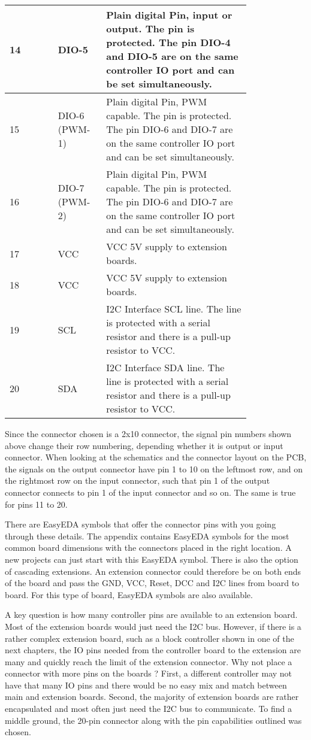 \begin{longtable}{@{}|l|p{0.2\linewidth}p{0.6\linewidth}@{}}
    \midrule
    14 & DIO-5 & Plain digital Pin, input or output. The pin is protected. The pin DIO-4 and DIO-5 are on the same controller IO port and can be set simultaneously. \\
    \midrule
    15 & DIO-6 (PWM-1) & Plain digital Pin, PWM capable. The pin is protected. The pin DIO-6 and DIO-7 are on the same controller IO port and can be set simultaneously. \\
    \midrule
    16 & DIO-7 (PWM-2) & Plain digital Pin, PWM capable. The pin is protected. The pin DIO-6 and DIO-7 are on the same controller IO port and can be set simultaneously. \\
    \midrule
    17 & VCC & VCC 5V supply to extension boards. \\
    \midrule
    18 & VCC & VCC 5V supply to extension boards. \\
    \midrule
    19 & SCL & I2C Interface SCL line. The line is protected with a serial resistor and there is a pull-up resistor to VCC. \\
    \midrule
    20 & SDA & I2C Interface SDA line. The line is protected with a serial resistor and there is a pull-up resistor to VCC. \\
\end{longtable}

Since the connector chosen is a 2x10 connector, the signal pin numbers shown above change their row numbering, depending whether it is output or input connector. When looking at the schematics and the connector layout on the PCB, the signals on the output connector have pin 1 to 10 on the leftmost row, and on the rightmost row on the input connector, such that pin 1 of the output connector connects to pin 1  of the input connector and so on. The same is true for pins 11 to 20. 

There are EasyEDA symbols that offer the connector pins with you going through these details. The appendix contains EasyEDA symbols for the most common board dimensions with the connectors placed in the right location. A new projects can just start with this EasyEDA symbol. There is also the option of  cascading extensions. An extension connector could therefore be on both ends of the board and pass the GND, VCC, Reset, DCC and I2C lines from board to board. For this type of board, EasyEDA symbols are also available.

A key question is how many controller pins are available to an extension board. Most of the extension boards would just need the I2C bus. However, if there is a rather complex extension board, such as a block controller shown in one of the next chapters, the IO pins needed from the controller board to the extension are many and quickly reach the limit of the extension connector. Why not place a connector with more pins on the boards ? First, a different controller may not have that many IO pins and there would be no easy mix and match between main and extension boards. Second, the majority of extension boards are rather encapsulated and most often just need the I2C bus to communicate. To find a middle ground, the 20-pin connector along with the pin capabilities outlined was chosen. 

